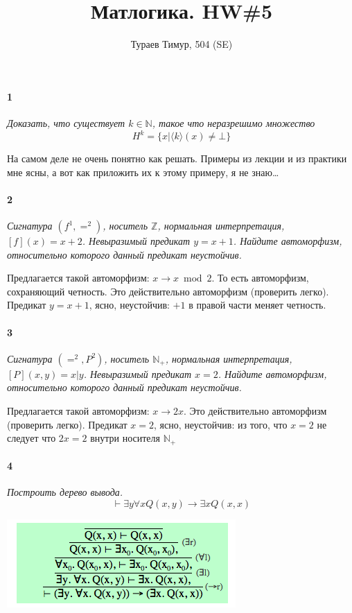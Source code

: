 \documentclass[russian]{article}
\begin{document}
\title{Матлогика. HW\#5}
\author{Тураев Тимур, 504 (SE)}

\maketitle

\paragraph{1} \textit{Доказать, что существует $k\in \mathbb{N}$, такое что неразрешимо множество \[ H^k = \{ x | \langle k \rangle (x) \neq \bot \} \]}

На самом деле не очень понятно как решать. Примеры из лекции и из практики мне ясны, а вот как приложить их к этому примеру, я не знаю…

\paragraph{2} \textit{Сигнатура $(f^1, =^2)$, носитель $\mathbb{Z}$, нормальная интерпретация, $[f](x) = x + 2$. Невыразимый предикат $y = x + 1$. Найдите автоморфизм, относительно которого данный предикат неустойчив.}

Предлагается такой автоморфизм: $x \rightarrow x \bmod 2$. То есть автоморфизм, сохраняющий четность. Это действительно автоморфизм (проверить легко).
Предикат $y = x + 1$, ясно, неустойчив: $+1$ в правой части меняет четность.

\paragraph{3} \textit{Сигнатура $(=^2, P^2)$, носитель $\mathbb{N}_+$, нормальная интерпретация, $[P](x, y) = x | y$. Невыразимый предикат $x = 2$. Найдите автоморфизм, относительно которого данный предикат неустойчив.}

Предлагается такой автоморфизм: $x \rightarrow 2x$. Это действительно автоморфизм (проверить легко).
Предикат $x = 2$, ясно, неустойчив: из того, что $x=2$ не следует что $2x = 2$ внутри носителя $\mathbb{N}_+$

\paragraph{4} \textit{Построить дерево вывода.
\[
\vdash \exists y \forall x Q(x,y) \rightarrow \exists x Q(x, x)
\]}

\begin{center}
\includegraphics[scale=0.64]{4.png} 
\end{center}
\end{document}
